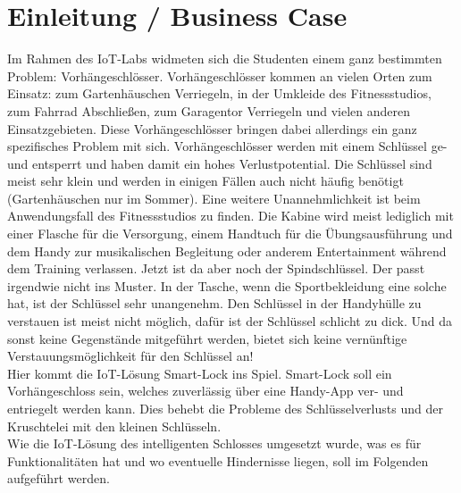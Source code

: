 
\chapter{Einleitung / Business Case}
Im Rahmen des IoT-Labs widmeten sich die Studenten einem ganz bestimmten Problem: Vorhängeschlösser. Vorhängeschlösser kommen an vielen Orten zum Einsatz: zum Gartenhäuschen Verriegeln, in der Umkleide des Fitnessstudios, zum Fahrrad Abschließen, zum Garagentor Verriegeln und vielen anderen Einsatzgebieten. Diese Vorhängeschlösser bringen dabei allerdings ein ganz spezifisches Problem mit sich. Vorhängeschlösser werden mit einem Schlüssel ge- und entsperrt und haben damit ein hohes Verlustpotential. Die Schlüssel sind meist sehr klein und werden in einigen Fällen auch nicht häufig benötigt (Gartenhäuschen nur im Sommer). Eine weitere Unannehmlichkeit ist beim Anwendungsfall des Fitnessstudios zu finden. Die Kabine wird meist lediglich mit einer Flasche für die Versorgung, einem Handtuch für die Übungsausführung und dem Handy zur musikalischen Begleitung oder anderem Entertainment während dem Training verlassen. Jetzt ist da aber noch der Spindschlüssel. Der passt irgendwie nicht ins Muster. In der Tasche, wenn die Sportbekleidung eine solche hat, ist der Schlüssel sehr unangenehm. Den Schlüssel in der Handyhülle zu verstauen ist meist nicht möglich, dafür ist der Schlüssel schlicht zu dick. Und da sonst keine Gegenstände mitgeführt werden, bietet sich keine vernünftige Verstauungsmöglichkeit für den Schlüssel an! 
\\ 
Hier kommt die IoT-Lösung Smart-Lock ins Spiel. Smart-Lock soll ein Vorhängeschloss sein, welches zuverlässig über eine Handy-App ver- und entriegelt werden kann. Dies behebt die Probleme des Schlüsselverlusts und der \glqq Kruschtelei\grqq{} mit den kleinen Schlüsseln.
\\ 
Wie die IoT-Lösung des intelligenten Schlosses umgesetzt wurde, was es für Funktionalitäten hat und wo eventuelle Hindernisse liegen, soll im Folgenden aufgeführt werden.